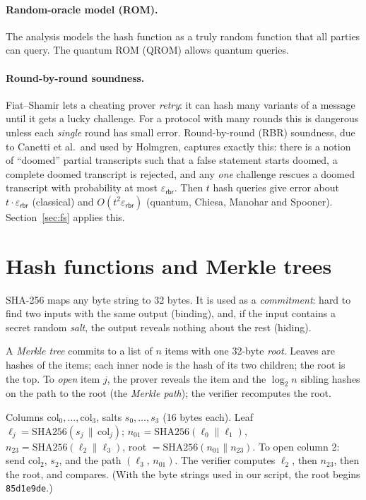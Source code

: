 \documentclass[11pt,a4paper]{article}
\newcommand{\epsrbr}{\varepsilon_{\mathsf{rbr}}}
\theoremstyle{definition}
\theoremstyle{plain}
\begin{document}
\paragraph{Random-oracle model (ROM).} The analysis models the hash function as a truly random
function that all parties can query. The quantum ROM (QROM) allows quantum queries.

\paragraph{Round-by-round soundness.} Fiat--Shamir lets a cheating prover \emph{retry}: it can hash
many variants of a message until it gets a lucky challenge. For a protocol with many rounds this is
dangerous unless each \emph{single} round has small error. Round-by-round (RBR) soundness, due to
Canetti et al.\ and used by Holmgren, captures exactly this: there is a notion of ``doomed'' partial
transcripts such that a false statement starts doomed, a complete doomed transcript is rejected, and
any \emph{one} challenge rescues a doomed transcript with probability at most $\epsrbr$. Then $t$
hash queries give error about $t\cdot\epsrbr$ (classical) and $O(t^2\epsrbr)$ (quantum, Chiesa,
Manohar and Spooner). Section~\ref{sec:fs} applies this.

\section{Hash functions and Merkle trees}
\label{sec:merkle}

SHA-256 maps any byte string to 32 bytes. It is used as a \emph{commitment}: hard to find two inputs
with the same output (binding), and, if the input contains a secret random \emph{salt}, the output
reveals nothing about the rest (hiding).

A \emph{Merkle tree} commits to a list of $n$ items with one 32-byte \emph{root}. Leaves are hashes of
the items; each inner node is the hash of its two children; the root is the top. To \emph{open} item
$j$, the prover reveals the item and the $\log_2 n$ sibling hashes on the path to the root (the
\emph{Merkle path}); the verifier recomputes the root.

\begin{example}
Columns $\mathrm{col}_0,\dots,\mathrm{col}_3$, salts $s_0,\dots,s_3$ (16 bytes each).
Leaf $\ell_j=\mathrm{SHA256}(s_j\,\|\,\mathrm{col}_j)$; $n_{01}=\mathrm{SHA256}(\ell_0\|\ell_1)$,
$n_{23}=\mathrm{SHA256}(\ell_2\|\ell_3)$, root $=\mathrm{SHA256}(n_{01}\|n_{23})$.
To open column 2: send $\mathrm{col}_2$, $s_2$, and the path $(\ell_3,\,n_{01})$.
The verifier computes $\ell_2$, then $n_{23}$, then the root, and compares.
(With the byte strings used in our script, the root begins \texttt{85d1e9de}.)
\end{example}
\end{document}
